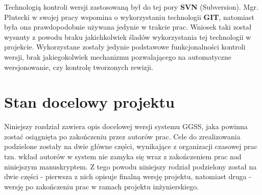 Technologią kontroli wersji zastosowaną był do tej pory \textbf{SVN} (Subversion). Mgr. Plutecki w swojej pracy wspomina o wykorzystaniu technologii \textbf{GIT}, natomiast była ona prawdopodobnie używana jedynie w trakcie prac. Wniosek taki został wysnuty z powodu braku jakichkolwiek śladów wykorzystania tej technologii w projekcie. Wykorzystane zostały jedynie podstawowe funkcjonalności kontroli wersji, brak jakiegokolwiek mechanizmu pozwalającego na automatyczne wersjonowanie, czy kontrolę tworzonych rewizji.



\chapter{Stan docelowy projektu}
\label{cha:docel}
Niniejszy rozdział zawiera opis docelowej wersji systemu GGSS, jaka powinna zostać osiągnięta po zakończeniu przez autorów prac. Cele do zrealizowania podzielone zostały na dwie główne części, wynikające z organizacji czasowej prac tzn. wkład autorów w system nie zamyka się wraz z zakończeniem prac nad niniejszym manuskryptem. Z tego powodu niniejszy rodział podzielony został na dwie części - pierwsza z nich opisuje finalną wersję projektu, natomiast druga - wersję po zakończeniu prac w ramach projektu inżynierskiego.

